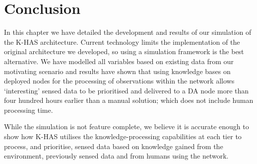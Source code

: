 \section{Conclusion}
In this chapter we have detailed the development and results of our simulation of the K-HAS architecture. Current technology limits the implementation of the original architecture we developed, so using a simulation framework is the best alternative. We have modelled all variables based on existing data from our motivating scenario and results have shown that using knowledge bases on deployed nodes for the processing of observations within the network allows `interesting' sensed data to be prioritised and delivered to a DA node more than four hundred hours earlier than a manual solution; which does not include human processing time.

While the simulation is not feature complete, we believe it is accurate enough to show how K-HAS utilises the knowledge-processing capabilities at each tier to process, and prioritise, sensed data based on knowledge gained from the environment, previously sensed data and from humans using the network.

